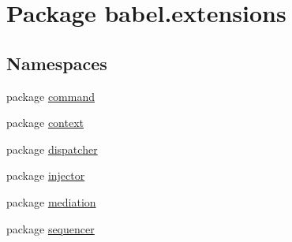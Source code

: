 \hypertarget{namespacebabel_1_1extensions}{\section{Package babel.\-extensions}
\label{namespacebabel_1_1extensions}
}
\subsection*{Namespaces}
\begin{DoxyCompactItemize}
\item 
package \hyperlink{namespacebabel_1_1extensions_1_1command}{command}
\item 
package \hyperlink{namespacebabel_1_1extensions_1_1context}{context}
\item 
package \hyperlink{namespacebabel_1_1extensions_1_1dispatcher}{dispatcher}
\item 
package \hyperlink{namespacebabel_1_1extensions_1_1injector}{injector}
\item 
package \hyperlink{namespacebabel_1_1extensions_1_1mediation}{mediation}
\item 
package \hyperlink{namespacebabel_1_1extensions_1_1sequencer}{sequencer}
\end{DoxyCompactItemize}
